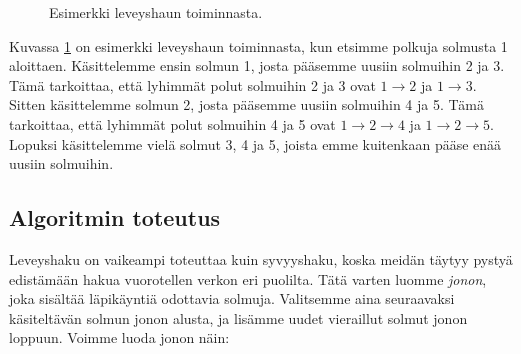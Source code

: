 \begin{figure}
\begin{center}
\end{center}
\caption{Esimerkki leveyshaun toiminnasta.}
\label{fig:levhak}
\end{figure}

Kuvassa \ref{fig:levhak} on esimerkki leveyshaun toiminnasta,
kun etsimme polkuja solmusta 1 aloittaen.
Käsittelemme ensin solmun 1, josta pääsemme uusiin solmuihin 2 ja 3.
Tämä tarkoittaa, että lyhimmät polut solmuihin 2 ja 3
ovat $1 \rightarrow 2$ ja $1 \rightarrow 3$.
Sitten käsittelemme solmun 2, josta pääsemme uusiin solmuihin 4 ja 5.
Tämä tarkoittaa, että lyhimmät polut solmuihin 4 ja 5
ovat $1 \rightarrow 2 \rightarrow 4$ ja $1 \rightarrow 2 \rightarrow 5$.
Lopuksi käsittelemme vielä solmut 3, 4 ja 5,
joista emme kuitenkaan pääse enää uusiin solmuihin.

\subsection{Algoritmin toteutus}

Leveyshaku on vaikeampi toteuttaa kuin syvyyshaku,
koska meidän täytyy pystyä edistämään hakua vuorotellen verkon eri puolilta.
Tätä varten luomme \emph{jonon}, joka sisältää läpikäyntiä odottavia solmuja.
Valitsemme aina seuraavaksi käsiteltävän solmun jonon alusta,
ja lisämme uudet vieraillut solmut jonon loppuun.
Voimme luoda jonon näin:

